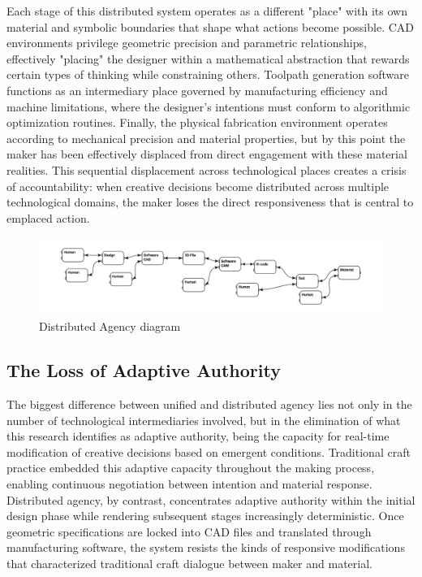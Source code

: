 Each stage of this distributed system operates as a different "place" with its own material and symbolic boundaries that shape what actions become possible. CAD environments privilege geometric precision and parametric relationships, effectively "placing" the designer within a mathematical abstraction that rewards certain types of thinking while constraining others. Toolpath generation software functions as an intermediary place governed by manufacturing efficiency and machine limitations, where the designer's intentions must conform to algorithmic optimization routines. Finally, the physical fabrication environment operates according to mechanical precision and material properties, but by this point the maker has been effectively displaced from direct engagement with these material realities. This sequential displacement across technological places creates a crisis of accountability: when creative decisions become distributed across multiple technological domains, the maker loses the direct responsiveness that is central to emplaced action.

\begin{figure}[h]
\centering
\includegraphics[width=1\textwidth]{figures/chapter1/fragmented agency.png}
\caption{Distributed Agency diagram}
\label{fig:distributed_agency}
\end{figure}

\subsection{The Loss of Adaptive Authority}

The biggest difference between unified and distributed agency lies not only in the number of technological intermediaries involved, but in the elimination of what this research identifies as adaptive authority, being the capacity for real-time modification of creative decisions based on emergent conditions. Traditional craft practice embedded this adaptive capacity throughout the making process, enabling continuous negotiation between intention and material response. Distributed agency, by contrast, concentrates adaptive authority within the initial design phase while rendering subsequent stages increasingly deterministic. Once geometric specifications are locked into CAD files and translated through manufacturing software, the system resists the kinds of responsive modifications that characterized traditional craft dialogue between maker and material.

